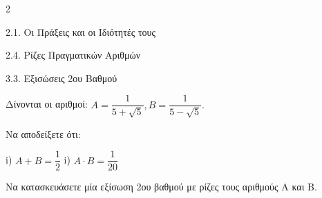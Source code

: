 \begin{ylh}{2}
    \item 2.1. Οι Πράξεις και οι Ιδιότητές τους
    \item 2.4. Ρίζες Πραγματικών Αριθμών
    \item 3.3. Εξισώσεις 2ου Βαθμού
\end{ylh}
Δίνονται οι αριθμοί: $A = \dfrac{1}{5 + \sqrt{5}},B = \dfrac{1}{5 - \sqrt{5}}.$

\begin{alist}
\item Να αποδείξετε ότι:

i) $A + B = \dfrac{1}{2}$
i) $A \cdot B = \dfrac{1}{20}$
\item Να κατασκευάσετε μία εξίσωση 2ου βαθμού με ρίζες τους αριθμούς Α και Β.
\end{alist}

